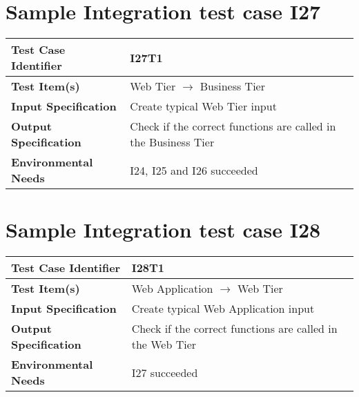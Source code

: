 \section{Sample Integration test case I27}\label{I27}
\begin{center}
	\vspace{0.6cm}
	\begin{tabular}{|l|l|}
		\hline
		\textbf{Test Case Identifier} & I27T1 \bigstrut \\\hline
		\textbf{Test Item(s)} & Web Tier \ensuremath{\rightarrow} Business Tier \bigstrut \\\hline
		\textbf{Input Specification} & Create typical Web Tier input \bigstrut \\\hline
		\textbf{Output Specification} & Check if the correct functions are called in the Business Tier \bigstrut \\\hline
		\textbf{Environmental Needs} & I24, I25 and I26 succeeded \bigstrut \\\hline
	\end{tabular}
\end{center}

\section{Sample Integration test case I28}\label{I28}
\begin{center}
	\vspace{0.6cm}
	\begin{tabular}{|l|l|}
		\hline
		\textbf{Test Case Identifier} & I28T1 \bigstrut \\\hline
		\textbf{Test Item(s)} & Web Application \ensuremath{\rightarrow} Web Tier \bigstrut \\\hline
		\textbf{Input Specification} & Create typical Web Application input \bigstrut \\\hline
		\textbf{Output Specification} & Check if the correct functions are called in the Web Tier \bigstrut \\\hline
		\textbf{Environmental Needs} & I27 succeeded \bigstrut \\\hline
	\end{tabular}
\end{center}

